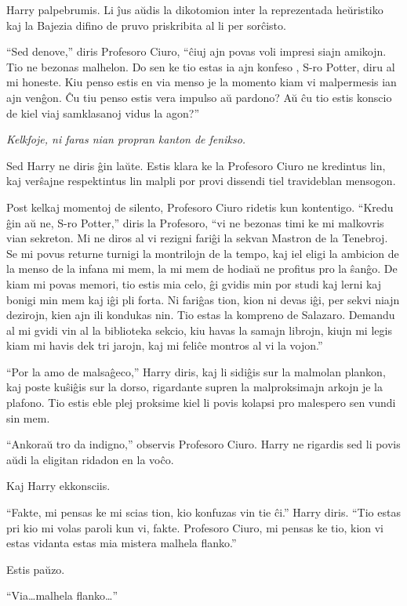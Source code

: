 Harry palpebrumis. Li ĵus aŭdis la dikotomion inter la reprezentada
heŭristiko kaj la Bajezia difino de pruvo priskribita al li per
sorĉisto.

``Sed denove,'' diris Profesoro Ciuro, ``ĉiuj ajn povas voli impresi
siajn amikojn. Tio ne bezonas malhelon. Do sen ke tio estas ia ajn
konfeso , S-ro Potter, diru al mi honeste. Kiu penso estis en via
menso je la momento kiam vi malpermesis ian ajn venĝon. Ĉu tiu penso
estis vera impulso aŭ pardono? Aŭ ĉu tio estis konscio de kiel viaj
samklasanoj vidus la agon?''

\emph{Kelkfoje, ni faras nian propran kanton de fenikso.}

Sed Harry ne diris ĝin laŭte. Estis klara ke la Profesoro Ciuro ne
kredintus lin, kaj verŝajne respektintus lin malpli por provi dissendi
tiel travideblan mensogon.

Post kelkaj momentoj de silento, Profesoro Ciuro ridetis kun
kontentigo. ``Kredu ĝin aŭ ne, S-ro Potter,'' diris la Profesoro, ``vi
ne bezonas timi ke mi malkovris vian sekreton. Mi ne diros al vi
rezigni fariĝi la sekvan Mastron de la Tenebroj. Se mi povus returne
turnigi la montrilojn de la tempo, kaj iel eligi la ambicion de la
menso de la infana mi mem, la mi mem de hodiaŭ ne profitus pro la
ŝanĝo. De kiam mi povas memori, tio estis mia celo, ĝi gvidis min por
studi kaj lerni kaj bonigi min mem kaj iĝi pli forta. Ni fariĝas tion,
kion ni devas iĝi, per sekvi niajn dezirojn, kien ajn ili kondukas
nin. Tio estas la kompreno de Salazaro. Demandu al mi gvidi vin al la
biblioteka sekcio, kiu havas la samajn librojn, kiujn mi legis kiam mi
havis dek tri jarojn, kaj mi feliĉe montros al vi la vojon.''

``Por la amo de malsaĝeco,'' Harry diris, kaj li sidiĝis sur la
malmolan plankon, kaj poste kuŝiĝis sur la dorso, rigardante
supren la malproksimajn arkojn je la plafono. Tio estis eble plej
proksime kiel li povis kolapsi pro malespero sen vundi sin mem.

``Ankoraŭ tro da indigno,'' observis Profesoro Ciuro. Harry ne
rigardis sed li povis aŭdi la eligitan ridadon en la voĉo.

Kaj Harry ekkonsciis.

``Fakte, mi pensas ke mi scias tion, kio konfuzas vin tie ĉi.'' Harry
diris. ``Tio estas pri kio mi volas paroli kun vi, fakte. Profesoro
Ciuro, mi pensas ke tio, kion vi estas vidanta estas mia mistera
malhela flanko.''

Estis paŭzo.

``Via\ldots malhela flanko\ldots''

